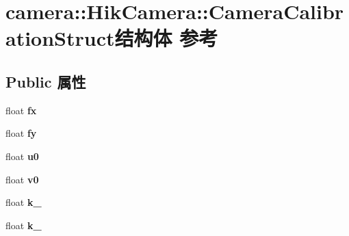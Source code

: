 \hypertarget{structcamera_1_1_hik_camera_1_1_camera_calibration_struct}{}\section{camera\+:\+:Hik\+Camera\+:\+:Camera\+Calibration\+Struct结构体 参考}
\label{structcamera_1_1_hik_camera_1_1_camera_calibration_struct}
\subsection*{Public 属性}
\begin{DoxyCompactItemize}
\item 
\mbox{\label{structcamera_1_1_hik_camera_1_1_camera_calibration_struct_af15661a81e14a644de17374adab21bcb}} 
float {\bfseries fx}
\item 
\mbox{\label{structcamera_1_1_hik_camera_1_1_camera_calibration_struct_ac6b53f4c349fee29af81c8aed56edb1a}} 
float {\bfseries fy}
\item 
\mbox{\label{structcamera_1_1_hik_camera_1_1_camera_calibration_struct_a26c2681a512862a21f1904818e00ac83}} 
float {\bfseries u0}
\item 
\mbox{\label{structcamera_1_1_hik_camera_1_1_camera_calibration_struct_ace307711dccc113b978c3a640b4aa65a}} 
float {\bfseries v0}
\item 
\mbox{\label{structcamera_1_1_hik_camera_1_1_camera_calibration_struct_aa0a4a147cc41ed56510c3eb208da8728}} 
float {\bfseries k\+\_}
\item 
\mbox{\label{structcamera_1_1_hik_camera_1_1_camera_calibration_struct_a9bbf792ff28ba60eda29863d2416895a}} 
float {\bfseries k\+\_}
\item 
\mbox{\label{structcamera_1_1_hik_camera_1_1_camera_calibration_struct_ac80eb365b07ed7478ca00292e9a1fc39}} 

\end{DoxyCompactItemize}
